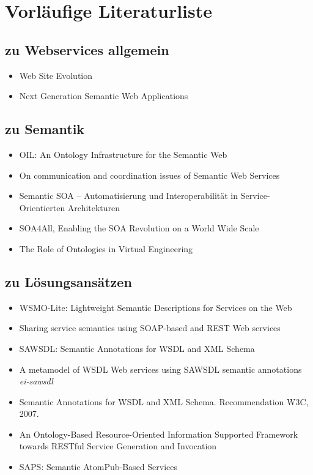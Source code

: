 \documentclass[12pt,a4paper]{article}
\begin{document}
\section*{Vorläufige Literaturliste}
\subsection*{zu Webservices allgemein}
\begin{itemize}
\item Web Site Evolution \cite{baresitalk2007}
\item Next Generation Semantic Web Applications \cite{Motta06nextgeneration}
\end{itemize}

\subsection*{zu Semantik}
\begin{itemize}
\item OIL: An Ontology Infrastructure for the Semantic Web \cite{oil}
\item On communication and coordination issues of Semantic Web Services \cite{WSMO}
\item Semantic SOA – Automatisierung und Interoperabilität in Service-Orientierten Architekturen \cite{semsoa}
\item SOA4All, Enabling the SOA Revolution on a World Wide Scale \cite{SOA4ALL}
\item The Role of Ontologies in Virtual Engineering \cite{ontologies}
\end{itemize}

\subsection*{zu Lösungsansätzen}
\begin{itemize}
\item WSMO-Lite: Lightweight Semantic Descriptions for Services on the Web \cite{WSMOLITE}
\item Sharing service semantics using SOAP-based and REST Web services \cite{shi1}
\item SAWSDL: Semantic Annotations for WSDL and XML Schema \cite{ky-sawsdl}
\item A metamodel of WSDL Web services using SAWSDL semantic annotations \emph{ei-sawsdl}
\item Semantic Annotations for WSDL and XML Schema. Recommendation W3C, 2007. \cite{w3c-sawsdl}
\item An Ontology-Based Resource-Oriented Information Supported Framework towards RESTful Service Generation and Invocation \cite{zg-ontorest}
\item SAPS: Semantic AtomPub-Based Services \cite{lr-saps}
\end{itemize}

 
\end{document}
